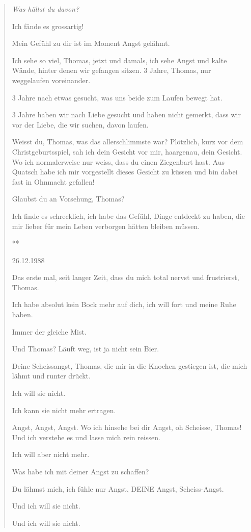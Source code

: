 \documentclass[10pt,a5paper]{book}
\newcommand{\sterne}{\par{\centering ***\par}}
\newenvironment{tg}{\begin{quote}\em}{\end{quote}}
\begin{document}
\begin{tg}
Was hältst du davon?

Ich fände es grossartig!

Mein Gefühl zu dir ist im Moment Angst gelähmt.

Ich sehe so viel, Thomas, jetzt und damals, ich sehe Angst und kalte Wände, hinter denen wir gefangen sitzen.
 3 Jahre, Thomas, nur weggelaufen voreinander.

3 Jahre nach etwas gesucht, was uns beide zum Laufen bewegt hat.

3 Jahre haben wir nach Liebe gesucht und haben nicht gemerkt, dass wir vor der Liebe, die wir suchen, davon laufen.

Weisst du, Thomas, was das allerschlimmste war? Plötzlich, kurz vor dem Christgeburtsspiel, sah ich dein Gesicht vor mir, haargenau, dein Gesicht. Wo ich normalerweise nur weiss, dass du einen Ziegenbart hast.
Aus Quatsch habe ich mir vorgestellt dieses Gesicht zu küssen und bin dabei fast in Ohnmacht gefallen!

Glaubst du an Vorsehung, Thomas?

Ich finde es schrecklich, ich habe das Gefühl, Dinge entdeckt zu haben, die mir lieber für mein Leben verborgen hätten bleiben müssen.


\sterne


26.12.1988

Das erste mal, seit langer Zeit, dass du mich total nervst und frustrierst, Thomas.

Ich habe absolut kein Bock mehr auf dich, ich will fort und meine Ruhe haben.

Immer der gleiche Mist.

Und Thomas? Läuft weg, ist ja nicht sein Bier.

Deine Scheissangst, Thomas, die mir in die Knochen gestiegen ist, die mich lähmt und runter drückt.

Ich will sie nicht.

Ich kann sie nicht mehr ertragen.

Angst, Angst, Angst. Wo ich hinsehe bei dir Angst, oh Scheisse, Thomas!
Und ich verstehe es und lasse mich rein reissen.

Ich will aber nicht mehr.

Was habe ich mit deiner Angst zu schaffen?

Du lähmst mich, ich fühle nur Angst, DEINE Angst, Scheiss-Angst.

Und ich will sie nicht.

Und ich will sie nicht.


\end{tg}
\end{document}
